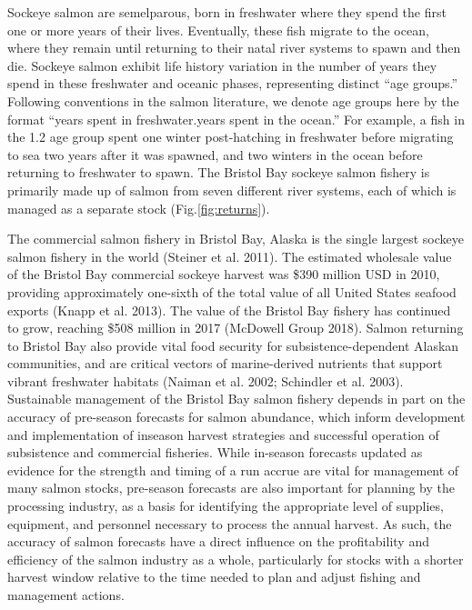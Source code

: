 \documentclass[
]{article}
\begin{document}
Sockeye salmon are semelparous, born in freshwater where they spend the first one or more years of their lives. Eventually, these fish migrate to the ocean, where they remain until returning to their natal river systems to spawn and then die. Sockeye salmon exhibit life history variation in the number of years they spend in these freshwater and oceanic phases, representing distinct ``age groups.'' Following conventions in the salmon literature, we denote age groups here by the format ``years spent in freshwater.years spent in the ocean.'' For example, a fish in the 1.2 age group spent one winter post-hatching in freshwater before migrating to sea two years after it was spawned, and two winters in the ocean before returning to freshwater to spawn. The Bristol Bay sockeye salmon fishery is primarily made up of salmon from seven different river systems, each of which is managed as a separate stock (Fig.\ref{fig:returns}).

The commercial salmon fishery in Bristol Bay, Alaska is the single largest sockeye salmon fishery in the world (Steiner et al. 2011). The estimated wholesale value of the Bristol Bay commercial sockeye harvest was \$390 million USD in 2010, providing approximately one-sixth of the total value of all United States seafood exports (Knapp et al. 2013). The value of the Bristol Bay fishery has continued to grow, reaching \$508 million in 2017 (McDowell Group 2018). Salmon returning to Bristol Bay also provide vital food security for subsistence-dependent Alaskan communities, and are critical vectors of marine-derived nutrients that support vibrant freshwater habitats (Naiman et al. 2002; Schindler et al. 2003). Sustainable management of the Bristol Bay salmon fishery depends in part on the accuracy of pre-season forecasts for salmon abundance, which inform development and implementation of inseason harvest strategies and successful operation of subsistence and commercial fisheries. While in-season forecasts updated as evidence for the strength and timing of a run accrue are vital for management of many salmon stocks, pre-season forecasts are also important for planning by the processing industry, as a basis for identifying the appropriate level of supplies, equipment, and personnel necessary to process the annual harvest. As such, the accuracy of salmon forecasts have a direct influence on the profitability and efficiency of the salmon industry as a whole, particularly for stocks with a shorter harvest window relative to the time needed to plan and adjust fishing and management actions.
\end{document}
